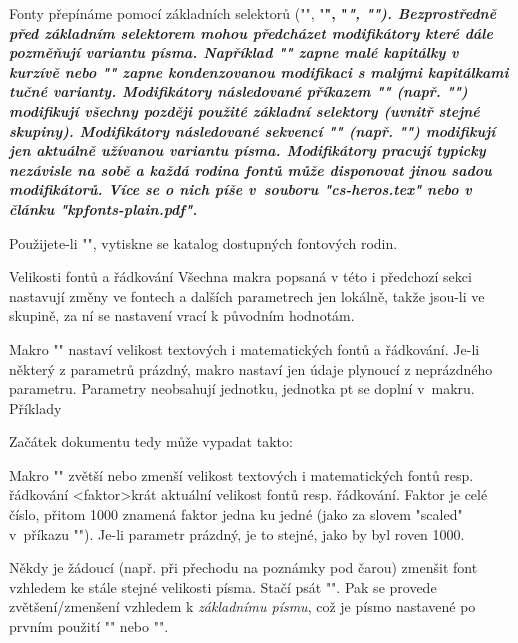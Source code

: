 Fonty přepínáme pomocí základních selektorů ("\rm", "\bf", "\it", "\bi").
Bezprostředně před základním selektorem mohou předcházet {\em modifikátory}
které dále pozměňují variantu písma. Například "\caps\it" zapne malé kapitálky
v kurzívě nebo "\cond\caps\bf" zapne kondenzovanou modifikaci s malými
kapitálkami tučné varianty.
Modifikátory následované příkazem "\fam" (např. "\caps\fam") modifikují
všechny později použité základní selektory (uvnitř stejné skupiny).
Modifikátory následované sekvencí "\one" (např. "\caps\one") modifikují jen
aktuálně užívanou variantu písma. Modifikátory pracují typicky nezávisle na
sobě a každá rodina fontů může disponovat jinou sadou modifikátorů. Více se
o nich píše v~souboru "cs-heros.tex" nebo v článku "kpfonts-plain.pdf".

Použijete-li "\fontfam[Catalog]", vytiskne se katalog dostupných fontových
rodin.


\sec Velikosti fontů a řádkování
Všechna makra popsaná v této i předchozí sekci nastavují změny ve fontech a dalších
parametrech jen lokálně, takže jsou-li ve skupině, 
za ní se nastavení vrací k původním hodnotám.

Makro "" nastaví velikost textových i
matematických fontů a řádkování. Je-li některý z parametrů prázdný, makro
nastaví jen údaje plynoucí z neprázdného parametru. 
Parametry neobsahují jednotku, jednotka pt se doplní v~makru. Příklady

\begtt
\typosize[10/12]    %
\typosize[11/12.5]  %
\typosize[8/]       %
\endtt

Začátek dokumentu tedy může vypadat takto:

\begtt
 \typosize[11.5/13]  %
\endtt

Makro "" zvětší nebo zmenší velikost
textových i matematických fontů resp. řádkování <faktor>krát aktuální 
velikost fontů resp. řádkování. 
Faktor je celé číslo, přitom 1000 znamená
faktor jedna ku jedné (jako za slovem "scaled" v~příkazu "\font"). Je-li parametr
prázdný, je to stejné, jako by byl roven 1000.

\begtt
\typoscale[800/800]    %
\typoscale[\magstep2/] %
\endtt

Někdy je žádoucí (např. při přechodu na poznámky pod čarou) zmenšit font vzhledem
ke stále stejné velikosti písma. Stačí psát
"\typobase{}". Pak se provede zvětšení/zmenšení
vzhledem k {\em základnímu písmu}, což je písmo nastavené po prvním použití 
"\typosize" nebo "\typoscale".

